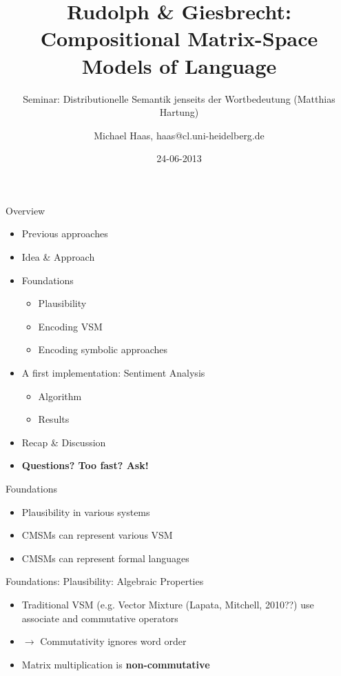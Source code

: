 \documentclass[12pt,a4paper]{beamer}
\author{Michael Haas, haas@cl.uni-heidelberg.de}
\title{Rudolph \& Giesbrecht: Compositional Matrix-Space Models of Language}
\subtitle{Seminar: Distributionelle Semantik jenseits der Wortbedeutung (Matthias Hartung)}
\date{24-06-2013}
\begin{document}
\begin{frame}
\maketitle
\end{frame}

\begin{frame}{Overview}
\begin{itemize}
\item Previous approaches %
\item Idea \& Approach %
\item Foundations
\begin{itemize}
    \item Plausibility %
    \item Encoding VSM %
    \item Encoding symbolic approaches
\end{itemize}
\item A first implementation: Sentiment Analysis
\begin{itemize}
    \item Algorithm %
    \item Results %
\end{itemize}
\item Recap \& Discussion
\item \textbf{Questions? Too fast? Ask!}
\end{itemize}
\end{frame}


\begin{frame}{Foundations} %
\begin{itemize}
\item Plausibility in various systems
\item CMSMs can represent various VSM
\item CMSMs can represent formal languages
\end{itemize}
\end{frame}

\begin{frame}{Foundations: Plausibility: Algebraic Properties}
\begin{itemize}
\item Traditional VSM (e.g. Vector Mixture (Lapata, Mitchell, 2010??) 
 use associate and commutative operators
\item $\to$ Commutativity ignores word order
\item Matrix multiplication is \textbf{non-commutative}
\end{itemize}
\end{frame}
\end{document}
